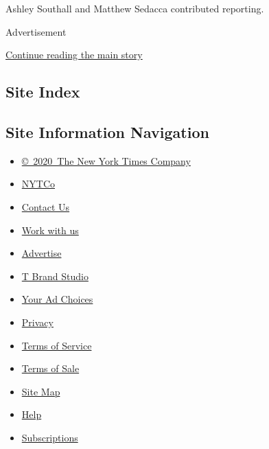 Ashley Southall and Matthew Sedacca contributed reporting.

Advertisement

\protect\hyperlink{after-bottom}{Continue reading the main story}

\hypertarget{site-index}{%
\subsection{Site Index}\label{site-index}}

\hypertarget{site-information-navigation}{%
\subsection{Site Information
Navigation}\label{site-information-navigation}}

\begin{itemize}
\tightlist
\item
  \href{https://help.nytimes.com/hc/en-us/articles/115014792127-Copyright-notice}{©~2020~The
  New York Times Company}
\end{itemize}

\begin{itemize}
\tightlist
\item
  \href{https://www.nytco.com/}{NYTCo}
\item
  \href{https://help.nytimes.com/hc/en-us/articles/115015385887-Contact-Us}{Contact
  Us}
\item
  \href{https://www.nytco.com/careers/}{Work with us}
\item
  \href{https://nytmediakit.com/}{Advertise}
\item
  \href{http://www.tbrandstudio.com/}{T Brand Studio}
\item
  \href{https://www.nytimes.com/privacy/cookie-policy\#how-do-i-manage-trackers}{Your
  Ad Choices}
\item
  \href{https://www.nytimes.com/privacy}{Privacy}
\item
  \href{https://help.nytimes.com/hc/en-us/articles/115014893428-Terms-of-service}{Terms
  of Service}
\item
  \href{https://help.nytimes.com/hc/en-us/articles/115014893968-Terms-of-sale}{Terms
  of Sale}
\item
  \href{https://spiderbites.nytimes.com}{Site Map}
\item
  \href{https://help.nytimes.com/hc/en-us}{Help}
\item
  \href{https://www.nytimes.com/subscription?campaignId=37WXW}{Subscriptions}
\end{itemize}
